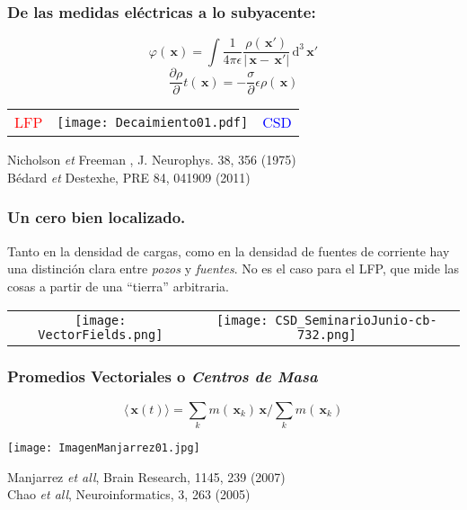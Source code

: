\documentclass{beamer}
\newcommand{\dd}{\, \mathrm{d}}
\newcommand{\xq}{\, \mathbf{x}}
\begin{document}
\begin{frame}
  \frametitle{De las medidas eléctricas a lo subyacente:} 
  \begin{equation}
    \varphi(\xq)
    =\int \frac{1}{4\pi\epsilon}
    \frac{\rho(\xq')}{|\xq-\xq'|} \dd^3 \xq'  
  \end{equation}
    \begin{equation}
      \frac{\partial \rho}\partial{t}(\xq)=
      -\frac{\sigma}\partial{\epsilon}\rho(\xq)
    \end{equation}
  \begin{center}
  \begin{tabular}{ccc}
   \textcolor{red}{LFP} & 
   \texttt{[image: Decaimiento01.pdf]} &
   \textcolor{blue}{CSD}
  \end{tabular}
  \end{center}
  {\tiny Nicholson \emph{et} Freeman , J.   Neurophys. 38, 356 (1975)\\
         Bédard \emph{et} Destexhe, PRE 84, 041909 (2011) }
\end{frame}





\begin{frame}
\frametitle{Un cero bien localizado.} 
Tanto en la densidad de cargas, como en la densidad de fuentes de corriente
hay una distinción clara entre \emph{pozos} y \emph{fuentes}.
No es el caso para el LFP, que mide las cosas a partir de una ``tierra''
arbitraria. 
\begin{tabular}{cc}
      \texttt{[image: VectorFields.png]} &
    \texttt{[image: CSD\_SeminarioJunio-cb-732.png]} 
\end{tabular}
\end{frame}


\begin{frame}
  \frametitle{Promedios Vectoriales o \emph{Centros de Masa}}
  \begin{equation}
    \langle \xq(t) \rangle=\sum_k m(\xq_k)\xq/\sum_k m(\xq_k)
  \end{equation}
  
  \begin{center}
    \texttt{[image: ImagenManjarrez01.jpg]}
  \end{center} 
  
 \begin{flushright}
  {\tiny  Manjarrez \emph{ et all}, Brain Research, 1145, 239 (2007) \\
      Chao \emph{ et all}, Neuroinformatics, 3, 263 (2005) }
  \end{flushright}

\end{frame}
\end{document}
